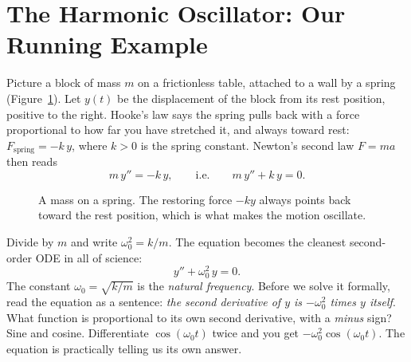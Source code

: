 \section{The Harmonic Oscillator: Our Running Example}
\label{ch38:oscillator}

Picture a block of mass $m$ on a frictionless table, attached to a wall by a
spring (Figure~\ref{ch38:fig-spring}). Let $y(t)$ be the displacement of the
block from its rest position, positive to the right. Hooke's law says the spring
pulls back with a force proportional to how far you have stretched it, and
always toward rest: $F_{\text{spring}} = -k\,y$, where $k > 0$ is the spring
constant. Newton's second law $F = ma$ then reads
\[
  m\,y'' = -k\,y,
  \qquad\text{i.e.}\qquad
  m\,y'' + k\,y = 0.
\]

\begin{figure}[H]
\centering
{}
\caption{A mass on a spring. The restoring force $-ky$ always points back
toward the rest position, which is what makes the motion oscillate.}
\label{ch38:fig-spring}
\end{figure}

Divide by $m$ and write $\omega_0^2 = k/m$. The equation becomes the cleanest
second-order ODE in all of science:
\begin{equation}
  y'' + \omega_0^2\, y = 0.
  \label{ch38:sho}
\end{equation}
The constant $\omega_0 = \sqrt{k/m}$ is the \emph{natural frequency}. Before we
solve it formally, read the equation as a sentence: \emph{the second derivative
of $y$ is $-\omega_0^2$ times $y$ itself}. What function is proportional to its
own second derivative, with a \emph{minus} sign? Sine and cosine. Differentiate
$\cos(\omega_0 t)$ twice and you get $-\omega_0^2 \cos(\omega_0 t)$. The equation
is practically telling us its own answer.

